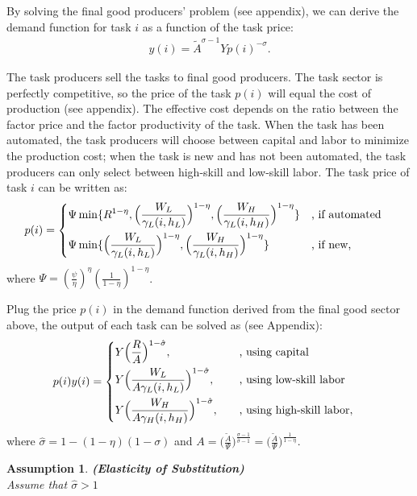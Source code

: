 \documentclass[12pt]{article}
\newtheorem{assumption}{Assumption}
\begin{document}
By solving the final good producers' problem (see appendix), we can derive the demand function for task $i$ as a function of the task price:
\begin{align*}
y(i) = \tilde{A}^{\sigma-1}Yp(i)^{-\sigma}.
\end{align*}

The task producers sell the tasks to final good producers. The task sector is perfectly competitive, so the price of the task $p(i)$ will equal the cost of production (see appendix). The effective cost depends on the ratio between the factor price and the factor productivity of the task. When the task has been automated, the task producers will choose between capital and labor to minimize the production cost; when the task is new and has not been automated, the task producers can only select between high-skill and low-skill labor. The task price of task $i$ can be written as: 
\begin{align*}
p(i) &= 
\begin{dcases}
\Psi \min\{R^{1-\eta},\Big(\frac{W_L}{\gamma_L(i,h_L)}\Big)^{1-\eta},\Big(\frac{W_H}{\gamma_L(i,h_H)}\Big)^{1-\eta}\} &\text{, if automated}  \\
\Psi \min\{\Big(\frac{W_L}{\gamma_L(i,h_L)}\Big)^{1-\eta},\Big(\frac{W_H}{\gamma_L(i,h_H)}\Big)^{1-\eta}\} &\text{, if new,}
\end{dcases}
\end{align*}
where $\Psi = (\frac{\psi}{\eta})^{\eta}(\frac{1}{1-\eta})^{1-\eta}$. 

Plug the price $p(i)$ in the demand function derived from the final good sector above, the output of each task can be solved as (see Appendix): 
\begin{align*}
p(i)y(i) &= 
\begin{dcases}
Y\Big(\frac{R}{A}\Big)^{1-\hat{\sigma}}, &\quad  \text{, using capital}  \\
Y\Big(\frac{W_L}{A\gamma_L(i,h_L)}\Big)^{1-\hat{\sigma}}, &\quad  \text{, using low-skill labor}    \\
Y\Big(\frac{W_H}{A\gamma_H(i,h_H)}\Big)^{1-\hat{\sigma}}, &\quad  \text{, using high-skill labor}, 
\end{dcases}
\end{align*}
where $\hat{\sigma} = 1-(1-\eta)(1-\sigma)$ and $A = \Big(\frac{\tilde{A}}{\Psi}\Big)^{\frac{\sigma-1}{\hat{\sigma}-1}}  = \Big(\frac{\tilde{A}}{\Psi}\Big)^{\frac{1}{1-\eta}}$.

\begin{assumption}{\bf (Elasticity of Substitution)} \\

Assume that $\hat{\sigma}>1$
\end{assumption}
\end{document}
